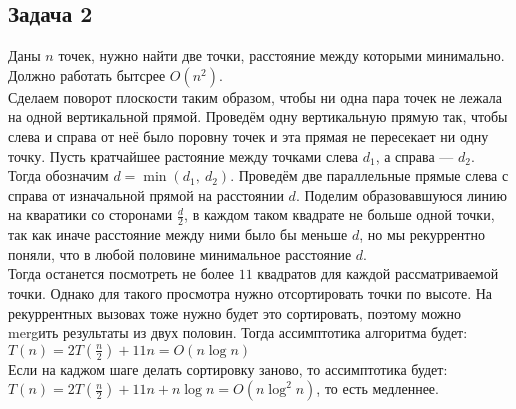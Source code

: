 \documentclass[12pt, a4paper]{article}
\begin{document}
    \subsection*{Задача 2}
    Даны $n$ точек, нужно найти две точки, расстояние между которыми минимально. Должно работать бытсрее $O(n^2)$.\\
    Сделаем поворот плоскости таким образом, чтобы ни одна пара точек не лежала на одной вертикальной прямой. Проведём 
    одну вертикальную прямую так, чтобы слева и справа от неё было поровну точек и эта прямая не пересекает ни одну точку. 
    Пусть кратчайшее растояние между точками слева $d_1$, а справа --- $d_2$.\\
    Тогда обозначим $d = \min(d_1,\ d_2)$. Проведём две параллельные прямые слева с справа от изначальной прямой
    на расстоянии $d$. Поделим образовавшуюся линию на кваратики со сторонами $\frac{d}{2}$, в каждом таком квадрате не 
    больше одной точки, так как иначе расстояние между ними было бы меньше $d$, но мы рекуррентно поняли, что в любой половине минимальное расстояние $d$.\\
    Тогда останется посмотреть не более $11$ квадратов для каждой рассматриваемой точки. Однако для такого просмотра нужно отсортировать точки по высоте. 
    На рекуррентных вызовах тоже нужно будет это сортировать, поэтому можно mergить результаты из двух половин. Тогда ассимптотика алгоритма будет:\\
    $T(n) = 2T(\frac{n}{2}) + 11n = O(n\log n)$\\
    Если на каджом шаге делать сортировку заново, то ассимптотика будет:\\
    $T(n) = 2T(\frac{n}{2}) + 11n + n\log n = O(n\log^2 n)$, то есть медленнее.
\end{document}
